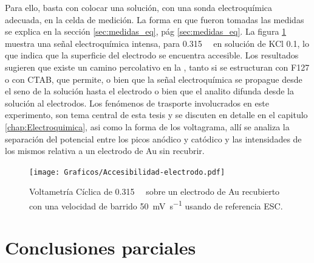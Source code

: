 			Para ello, basta con colocar una solución, con una sonda electroquímica adecuada, en la celda de medición. La forma en que fueron tomadas las medidas se explica en la sección \ref{sec:medidas_eq}, pág \ref{sec:medidas_eq}. La figura \ref{fig:accesibilidad} muestra una señal electroquímica intensa, para \aminorutenio\space \SI{0.315}{\milli\Molar} en solución de KCl \SI{0.1}{\Molar}, lo que indica que la superficie del electrodo se encuentra accesible. Los resultados sugieren que existe un camino percolativo en la \pdm, tanto si se estructuran con F127 o con CTAB, que permite, o bien que la señal electroquímica se propague desde el seno de la solución hasta el electrodo o bien que el analito difunda desde la solución al electrodos.   Los fenómenos de trasporte involucrados en este experimento, son tema central de esta tesis y se discuten en detalle en el capitulo \ref{chap:Electroquimica}, asi como la forma de los voltagrama, allí se analiza la separación del potencial entre los picos anódico y catódico y las intensidades de los mismos relativa a un electrodo de Au sin recubrir. 

						\begin{figure}[th]
				 	   	    \begin{center} 
				        	\texttt{[image: Graficos/Accesibilidad-electrodo.pdf]}
				       		\caption[Accesibilidad electrodo de trabajo.]{Voltametría Cíclica de \aminorutenio\space \SI{0.315}{\milli\Molar} sobre un electrodo de Au recubierto \pdmF\space con una velocidad de barrido \SI{50}{\milli\volt.\second^{-1}} usando de referencia ESC.}
				         	\label{fig:accesibilidad}
				     		\end{center}
				     		\end{figure}


\section{Conclusiones parciales}

